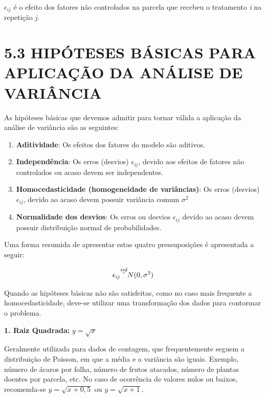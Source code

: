 \documentclass[
]{book}
\begin{document}
\(\epsilon_{ij}\) é o efeito dos fatores não controlados na parcela que recebeu o tratamento \emph{i} na repetição \emph{j}.

\hypertarget{hipuxf3teses-buxe1sicas-para-aplicauxe7uxe3o-da-anuxe1lise-de-variuxe2ncia}{%
\chapter{5.3 HIPÓTESES BÁSICAS PARA APLICAÇÃO DA ANÁLISE DE VARIÂNCIA}\label{hipuxf3teses-buxe1sicas-para-aplicauxe7uxe3o-da-anuxe1lise-de-variuxe2ncia}}

As hipóteses básicas que devemos admitir para tornar válida a aplicação da análise de variância são as seguintes:

\begin{enumerate}
\def\labelenumi{\arabic{enumi})}
\item
  \textbf{Aditividade}: Os efeitos dos fatores do modelo são aditivos.
\item
  \textbf{Independência}: Os erros (desvios) \(\epsilon_{ij}\), devido aos efeitos de fatores não controlados ou acaso devem ser independentes.
\item
  \textbf{Homocedasticidade (homogeneidade de variâncias)}: Os erros (desvios) \(\epsilon_{ij}\), devido ao acaso devem possuir variância comum \(\sigma^2\)
\item
  \textbf{Normalidade dos desvios}: Os erros ou desvios \(\epsilon_{ij}\) devido ao acaso devem possuir distribuição normal de probabilidades.
\end{enumerate}

Uma forma resumida de apresentar estas quatro pressuposições é apresentada a seguir:

\[
\epsilon_{ij} \overset{iid}{\tilde{}} N(0,\sigma^2) \\
\]

Quando as hipóteses básicas não são satisfeitas, como no caso mais frequente a homocedasticidade, deve-se utilizar uma transformação dos dados para contormar o problema.

\textbf{1. Raiz Quadrada:} \(y=\sqrt{x}\)

Geralmente utilizada para dados de contagem, que frequentemente seguem a distribuição de Poisson, em que a média e a variância são iguais. Exemplo, número de ácaros por folha, número de frutos atacados, número de plantas doentes por parcela, etc. No caso de ocorrência de valores nulos ou baixos, recomenda-se \(y=\sqrt{x+0,5}\) ou \(y=\sqrt{x+1}\).
\end{document}
